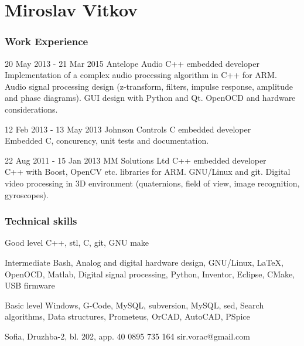 \documentclass{tccv}
\begin{document}
\part{Miroslav Vitkov}


\section{Work Experience}
\begin{eventlist}
\item{20 May 2013 - 21 Mar 2015}
     {Antelope Audio}
     {C++ embedded developer} \\
Implementation of a complex audio processing algorithm in C++ for ARM.
Audio signal processing design (z-transform, filters, impulse response, amplitude and phase diagrams).
GUI design with Python and Qt.
OpenOCD and hardware considerations.

\item{12 Feb 2013 - 13 May 2013}
     {Johnson Controls}
     {C embedded developer} \\
Embedded C, concurency, unit tests and documentation.

\item{22 Aug 2011 - 15 Jan 2013}
     {MM Solutions Ltd}
     {C++ embedded developer} \\
C++ with Boost, OpenCV etc. libraries for ARM.
GNU/Linux and git.
Digital video processing in 3D environment (quaternions, field of view, image recognition, gyroscopes).
\end{eventlist}


\section{Technical skills}
\begin{factlist}
\item{Good level}
     {C++, stl, C, git, GNU make}

\item{Intermediate}
     {Bash, Analog and digital hardware design, GNU/Linux, LaTeX, OpenOCD, Matlab, Digital signal processing, Python, Inventor, Eclipse, CMake, USB firmware}

\item{Basic level}
     {Windows, G-Code, MySQL, subversion, MySQL, sed, Search algorithms, Data structures, Prometeus, OrCAD, AutoCAD, PSpice}
\end{factlist}


\personal
    {Sofia, Druzhba-2, bl. 202, app. 40}
    {0895 735 164}
    {sir.vorac@gmail.com}
\end{document}
